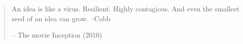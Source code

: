 \begin{quote}
An idea is like a virus. Resilient. Highly contagious. And even the smallest seed of an idea can grow.   --Cobb

\medskip \indent --
      The movie Inception (2010)
\end{quote}
